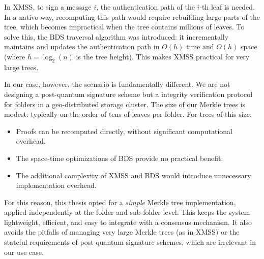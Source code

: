 In XMSS, to sign a message $i$, the authentication path of the $i$-th leaf is needed. In a native way, recomputing this path would require rebuilding large parts of the tree, which becomes impractical when the tree contains millions of leaves. To solve this, the BDS traversal algorithm was introduced: it incrementally maintains and updates the authentication path in $O(h)$ time and $O(h)$ space (where $h = \log_2(n)$ is the tree height). This makes XMSS practical for very large trees.

In our case, however, the scenario is fundamentally different. We are not
designing a post-quantum signature scheme but a integrity verification protocol
for folders in a geo-distributed storage cluster. The size of our Merkle trees is modest: typically on the order of tens of leaves per folder. For trees of this size:
\begin{itemize}
    \item Proofs can be recomputed directly, without significant computational overhead.
    \item The space-time optimizations of BDS provide no practical benefit.
    \item The additional complexity of XMSS and BDS would introduce unnecessary implementation overhead.
\end{itemize}

For this reason, this thesis opted for a \emph{simple} Merkle tree implementation, applied independently at the folder and sub-folder level. This keeps the system lightweight, efficient, and easy to integrate with a consensus mechanism. It also avoids the pitfalls of managing very large Merkle trees (as in XMSS) or the stateful requirements of post-quantum signature schemes, which are irrelevant in our use case.

